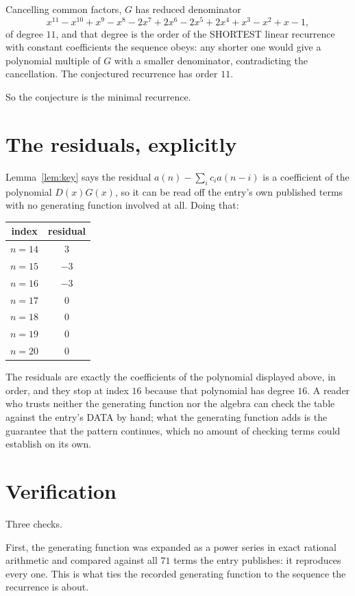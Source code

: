 \documentclass[11pt,a4paper]{article}
\theoremstyle{plain}
\theoremstyle{definition}
\begin{document}
Cancelling common factors, $G$ has reduced denominator
\[
x^{11} - x^{10} + x^{9} - x^{8} - 2 x^{7} + 2 x^{6} - 2 x^{5} + 2 x^{4} + x^{3} - x^{2} + x - 1,
\]
of degree $11$, and that degree is the order of the SHORTEST linear recurrence with
constant coefficients the sequence obeys: any shorter one would give a polynomial multiple of
$G$ with a smaller denominator, contradicting the cancellation. The conjectured recurrence has
order $11$.

So the conjecture is the minimal recurrence.

\section{The residuals, explicitly}

Lemma~\ref{lem:key} says the residual $a(n)-\sum_ic_ia(n-i)$ is a coefficient of the
polynomial $D(x)G(x)$, so it can be read off the entry's own published terms with no
generating function involved at all. Doing that:
\begin{center}
\begin{tabular}{cc}
index & residual \\ \hline
$n=14$ & $3$ \\
$n=15$ & $-3$ \\
$n=16$ & $-3$ \\
$n=17$ & $0$ \\
$n=18$ & $0$ \\
$n=19$ & $0$ \\
$n=20$ & $0$
\end{tabular}
\end{center}
The residuals are exactly the coefficients of the polynomial displayed above, in order, and
they stop at index $16$ because that polynomial has degree $16$. A reader who trusts
neither the generating function nor the algebra can check the table against the entry's DATA
by hand; what the generating function adds is the guarantee that the pattern continues, which
no amount of checking terms could establish on its own.

\section{Verification}

Three checks.

First, the generating function was expanded as a power series in exact rational arithmetic and
compared against all $71$ terms the entry publishes: it reproduces every one. This is
what ties the recorded generating function to the sequence the recurrence is about.
\end{document}
